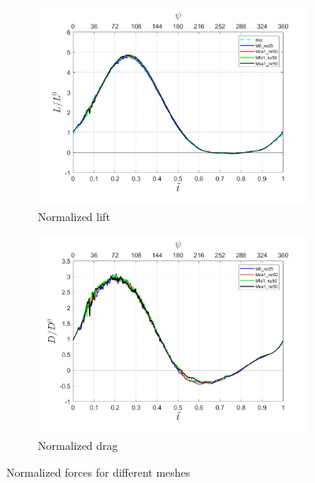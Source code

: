 \begin{figure}[H]
\centering

\begin{subfigure}[b]{0.7\textwidth}
\centering
\includegraphics[width=1\textwidth]{figures/Results/Lift_adapt_strat.png}
\caption{Normalized lift}
\label{fig:lift_plot}
\end{subfigure}
\begin{subfigure}[b]{0.7\textwidth}
\centering
\includegraphics[width=1\textwidth]{figures/Results/Drag_adapt_strat.png}
\caption{Normalized drag}
\label{fig:drag_plot}
\end{subfigure}

\label{fig:force_response_adapt}
\caption{Normalized forces for different meshes}
\end{figure}

